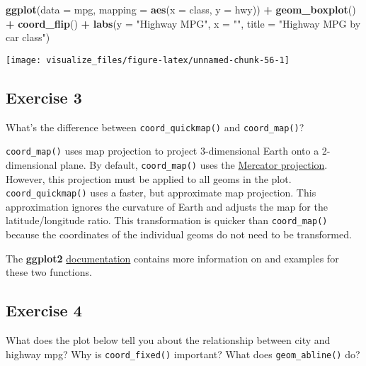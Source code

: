 \documentclass[]{book}
\newenvironment{Shaded}{\begin{snugshade}}{\end{snugshade}}
\newcommand{\DataTypeTok}[1]{\textcolor[rgb]{0.13,0.29,0.53}{#1}}
\newcommand{\KeywordTok}[1]{\textcolor[rgb]{0.13,0.29,0.53}{\textbf{#1}}}
\newcommand{\NormalTok}[1]{#1}
\newcommand{\OperatorTok}[1]{\textcolor[rgb]{0.81,0.36,0.00}{\textbf{#1}}}
\newcommand{\StringTok}[1]{\textcolor[rgb]{0.31,0.60,0.02}{#1}}
\theoremstyle{plain}
\theoremstyle{remark}
\theoremstyle{definition}
\theoremstyle{definition}
\theoremstyle{definition}
\theoremstyle{remark}
\begin{document}
\begin{Shaded}
\begin{Highlighting}[]
\KeywordTok{ggplot}\NormalTok{(}\DataTypeTok{data =}\NormalTok{ mpg, }\DataTypeTok{mapping =} \KeywordTok{aes}\NormalTok{(}\DataTypeTok{x =}\NormalTok{ class, }\DataTypeTok{y =}\NormalTok{ hwy)) }\OperatorTok{+}
\StringTok{  }\KeywordTok{geom_boxplot}\NormalTok{() }\OperatorTok{+}
\StringTok{  }\KeywordTok{coord_flip}\NormalTok{() }\OperatorTok{+}
\StringTok{  }\KeywordTok{labs}\NormalTok{(}\DataTypeTok{y =} \StringTok{"Highway MPG"}\NormalTok{, }\DataTypeTok{x =} \StringTok{""}\NormalTok{, }\DataTypeTok{title =} \StringTok{"Highway MPG by car class"}\NormalTok{)}
\end{Highlighting}
\end{Shaded}

\begin{center}\texttt{[image: visualize\_files/figure-latex/unnamed-chunk-56-1]} \end{center}

\hypertarget{exercise-3-3}{%
\subsection{Exercise 3}\label{exercise-3-3}}

What's the difference between \texttt{coord\_quickmap()} and
\texttt{coord\_map()}?

\texttt{coord\_map()} uses map projection to project 3-dimensional Earth
onto a 2-dimensional plane. By default, \texttt{coord\_map()} uses the
\href{https://en.wikipedia.org/wiki/Mercator_projection}{Mercator
projection}. However, this projection must be applied to all geoms in
the plot. \texttt{coord\_quickmap()} uses a faster, but approximate map
projection. This approximation ignores the curvature of Earth and
adjusts the map for the latitude/longitude ratio. This transformation is
quicker than \texttt{coord\_map()} because the coordinates of the
individual geoms do not need to be transformed.

The \textbf{ggplot2}
\href{http://docs.ggplot2.org/current/coord_map.html}{documentation}
contains more information on and examples for these two functions.

\hypertarget{exercise-4-2}{%
\subsection{Exercise 4}\label{exercise-4-2}}

What does the plot below tell you about the relationship between city
and highway mpg? Why is \texttt{coord\_fixed()} important? What does
\texttt{geom\_abline()} do?
\end{document}
